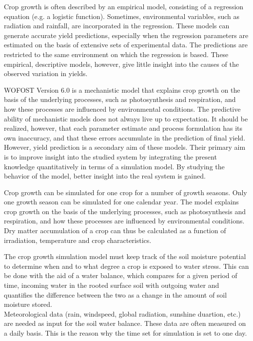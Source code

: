 \documentclass[11pt]{article}
\newcommand{\FigDir}{.}
\begin{document}
Crop growth is often described by an empirical model, consisting of a regression
equation (e.g. a logistic function). Sometimes, environmental variables, such as
radiation and rainfall, are incorporated in the regression. These models can generate
accurate yield predictions, especially when the regression parameters are estimated on
the basis of extensive sets of experimental data. The predictions are restricted to the
same environment on which the regression is based. These empirical, descriptive
models, however, give little insight into the causes of the observed variation in yields. 

\bigskip
WOFOST Version 6.0 is a mechanistic model that explains crop growth on the basis
of the underlying processes, such as photosynthesis and respiration, and how these
processes are influenced by environmental conditions. The predictive ability of
mechanistic models does not always live up to expectation. It should be realized,
however, that each parameter estimate and process formulation has its own inaccura\-cy, and that these errors accumulate in the prediction of final yield. However, yield
prediction is a secondary aim of these models. Their primary aim is to improve
insight into the studied system by integrating the present knowl\-edge quantitatively in
terms of a simulation model. By studying the behavior of the model, better insight
into the real system is gained.

Crop growth can be simulated for one crop for a number of growth seasons. Only
one growth season can be simulated for one calendar year.  The model explains crop
growth on the basis of the underly\-ing processes, such as photosynthesis and respira\-tion, and how these processes are influenced by environmental conditions. \\
Dry matter accumulation of a crop can thus be calculated as a function of irradiation,
temperature and crop characteristics.

The crop growth simulation model must keep track of the soil moisture potential to
deter\-mine when and to what degree a crop is exposed to water stress. This can be
done with the aid of a water balance, which compares for a given period of time,
incoming water in the rooted surface soil with outgoing water and quantifies the
difference between the two as a change in the amount of soil moisture stored.\\
Meteorological data (rain, windspeed, global radiation, sunshine duartion, etc.) are
needed as input for the soil water balance. These data are often measured on a daily
basis. This is the reason why the time set for simulation is set to one day. \\
\begin{figure}[htbp]
 \begin{center}\epsfig{file=\FigDir/DAGLOOP.eps,width=7.04cm} \end{center}
\end{figure}
\begin{figure}[htbp]
 \begin{center}\epsfig{file=\FigDir/JAARLOOP.eps,width=7.04cm} \end{center}
\end{figure}
\end{document}
